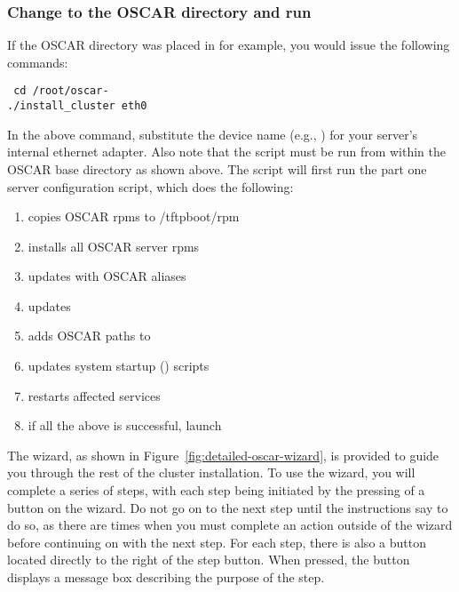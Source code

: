 \subsubsection{Change to the OSCAR directory and run }
\label{det:installcluster}

\begchange
If the OSCAR directory was placed in  for example, you
would issue the following commands:

\vspace{11pt}
{\tt
  cd /root/oscar-\oscarversion \\
\indent  ./install\_cluster eth0
}
\vspace{11pt}
\endchange
  
\begchange
In the above command, substitute the device name 
\endchange
(e.g., )
for your server's internal ethernet adapter. Also note that the
 script must be run from within the OSCAR base
directory as shown above. The script will first run the part one
server configuration script, which does the following:

\begin{enumerate}
\item copies OSCAR rpms to /tftpboot/rpm
\item installs all OSCAR server rpms
\item updates  with OSCAR aliases
\item updates  
\item adds OSCAR paths to  
\item updates system startup () scripts
\item restarts affected services
\item if all the above is successful, launch 
\end{enumerate}
  
The wizard, as shown in
Figure~\ref{fig:detailed-oscar-wizard}, is provided to guide you
through the rest of the cluster installation.  To use the wizard, you
will complete a series of steps, with each step being initiated by the
pressing of a button on the wizard. Do not go on to the next step
until the instructions say to do so, as there are times when you must
complete an action outside of the wizard before continuing on with the
next step. For each step, there is also a  button located
directly to the right of the step button. When pressed, the
 button displays a message box describing the purpose of
the step.

